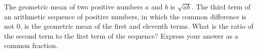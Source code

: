 The geometric mean of two positive numbers $a$ and $b$ is $\sqrt{ab}$. The third term of an arithmetic sequence of positive numbers, in which the common difference is not $0$, is the geometric mean of the first and eleventh terms. What is the ratio of the second term to the first term of the sequence? Express your answer as a common fraction.
